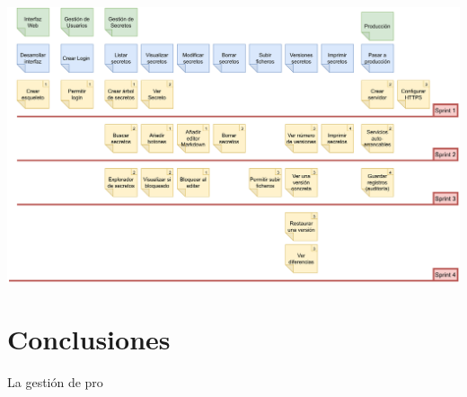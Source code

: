 \documentclass{\ClassPath/viu-tfm-template}
\begin{document}
\begin{center}
    \includegraphics[width=\linewidth]{img/kanban.png}
\end{center}

\chapter{Conclusiones}

La gestión de pro
\end{document}
